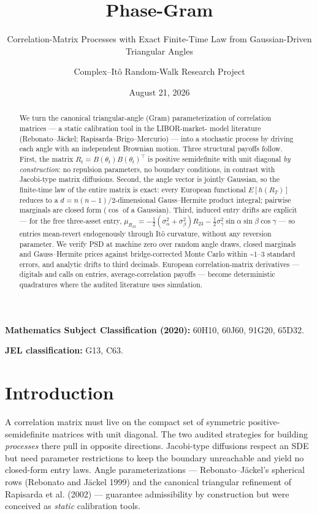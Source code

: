 \documentclass[
  english,
  10pt,
  letterpaper,
  DIV=11,
  numbers=noendperiod]{scrartcl}
\title{Phase-Gram}
\subtitle{Correlation-Matrix Processes with Exact Finite-Time Law from
Gaussian-Driven Triangular Angles}
\author{Complex--Itô Random-Walk Research Project}
\date{August 21, 2026}
\renewcommand*\contentsname{Table of contents}
\newcommand\contentsname{Table of contents}
\begin{document}
\maketitle
\begin{abstract}
We turn the canonical triangular-angle (Gram) parameterization of
correlation matrices --- a static calibration tool in the LIBOR-market-
model literature (Rebonato--Jäckel; Rapisarda--Brigo--Mercurio) --- into
a stochastic process by driving each angle with an independent Brownian
motion. Three structural payoffs follow. First, the matrix
\(R_t=B(\theta_t)B(\theta_t)^\top\) is positive semidefinite with unit
diagonal \emph{by construction}: no repulsion parameters, no boundary
conditions, in contrast with Jacobi-type matrix diffusions. Second, the
angle vector is jointly Gaussian, so the finite-time law of the entire
matrix is exact: every European functional \(E[h(R_T)]\) reduces to a
\(d=n(n-1)/2\)-dimensional Gauss--Hermite product integral; pairwise
marginals are closed form (\(\cos\) of a Gaussian). Third, induced entry
drifts are explicit --- for the free three-asset entry,
\(\mu_{R_{23}}=-\tfrac12(\sigma_\alpha^2+\sigma_\beta^2)R_{23}
-\tfrac12\sigma_\gamma^2\sin\alpha\sin\beta\cos\gamma\) --- so entries
mean-revert endogenously through Itô curvature, without any reversion
parameter. We verify PSD at machine zero over random angle draws, closed
marginals and Gauss--Hermite prices against bridge-corrected Monte Carlo
within \textasciitilde1--3 standard errors, and analytic drifts to third
decimals. European correlation-matrix derivatives --- digitals and calls
on entries, average-correlation payoffs --- become deterministic
quadratures where the audited literature uses simulation.
\end{abstract}

\renewcommand*\contentsname{Table of contents}
{
\setcounter{tocdepth}{2}
\tableofcontents
}

\textbf{Mathematics Subject Classification (2020):} 60H10, 60J60, 91G20,
65D32.

\textbf{JEL classification:} G13, C63.

\section{Introduction}\label{sec-introduction}

A correlation matrix must live on the compact set of symmetric positive-
semidefinite matrices with unit diagonal. The two audited strategies for
building \emph{processes} there pull in opposite directions. Jacobi-type
diffusions respect an SDE but need parameter restrictions to keep the
boundary unreachable and yield no closed-form entry laws. Angle
parameterizations --- Rebonato--Jäckel's spherical rows (Rebonato and
Jäckel 1999) and the canonical triangular refinement of Rapisarda et al.
(2002) --- guarantee admissibility by construction but were conceived as
\emph{static} calibration tools.
\end{document}
